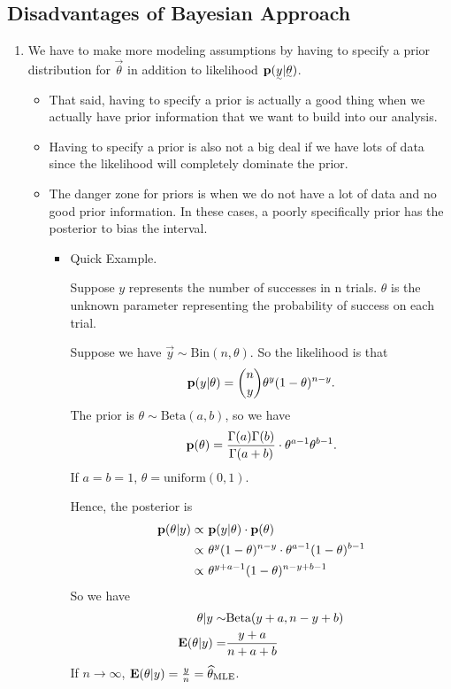 \subsection{Disadvantages of Bayesian Approach}
\begin{enumerate}
    \item We have to make more modeling assumptions by having to specify a prior distribution for $\vec{\theta}$ in addition to likelihood $\p(\vec{y}| \vec{\theta})$. 
    \begin{itemize}
        \item That said, having to specify a prior is actually a good thing when we actually have prior information that we want to build into our analysis.
        \item Having to specify a prior is also not a big deal if we have lots of data since the likelihood will completely dominate the prior.
        \item The danger zone for priors is when we do not have a lot of data and no good prior information. In these cases, a poorly specifically prior has the posterior to bias the interval.
        \begin{itemize}
            \item Quick Example.
            
            Suppose $y$ represents the number of successes in n trials. $\theta$ is the unknown parameter representing the probability of success on each trial. 
            
            Suppose we have $\vec{y} \sim \text{Bin}(n, \theta)$. So the likelihood is that 
            \[
                {\mathbf p}(y|\theta) = \binom{n}{y}\theta^y(1-\theta)^{n-y}.
            \]
            The prior is $\theta \sim \text{Beta}(a, b)$,  so we have 
            \[
                {\mathbf p}(\theta) = \frac{\Gamma(a) \Gamma(b)}{\Gamma(a+b)} \cdot \theta^{a-1} \theta^{b-1}.
            \]
            If $a=b=1$, $\theta = \text{uniform}(0, 1)$.
            
            Hence, the posterior is 
            \begin{align*}
                {\mathbf p}(\theta|y) 
                \propto& ~{\mathbf p}(y| \theta) \cdot {\mathbf p}(\theta)\\
                \propto& ~\theta^y(1-\theta)^{n-y} \cdot \theta^{a-1} (1 - \theta)^{b-1}\\
                \propto& ~\theta^{y+a-1} (1-\theta)^{n-y+b-1}
            \end{align*}
            So we have
            \begin{align*}
                \theta| y \sim& \text{Beta}(y+a, n-y+b)\\
                {\mathbf E}(\theta| y) =& \frac{y+a}{n+a+b}
            \end{align*}
            If $n \rightarrow \infty$, ${\mathbf E}(\theta| y) = \frac{y}{n} = \widehat{\theta}_{\text{MLE}}$.
            

\end{itemize}
\end{itemize}
\end{enumerate}
